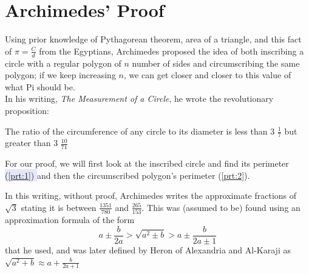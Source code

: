 \documentclass{article}
\begin{document}
\begin{theorem}\label{thm:ipsum}

\end{theorem}



\section{Archimedes' Proof}
Using prior knowledge of Pythagorean theorem, area of a triangle, and this fact of $\pi = \frac{C}{d}$ from the Egyptians, Archimedes proposed the idea of both inscribing a circle with a regular polygon of $n$ number of sides and circumscribing the same polygon; if we keep increasing $n$, we can get closer and closer to this value of what Pi should be. \\

In his writing, \textit{The Measurement of a Circle}, he wrote the revolutionary proposition:
\begin{proposition}
The ratio of the circumference of any circle to its diameter is less than 3 $\frac{1}{7}$ but greater than 3 $\frac{10}{71}$
\end{proposition}

For our proof, we will first look at the inscribed circle and find its perimeter \colorbox{Lavender}{(\ref{prt:1}) %
} and then the circumscribed polygon's perimeter (\ref{prt:2}). \\

\begin{remark} \label{rmk:approx}
In this writing, without proof, Archimedes writes the approximate fractions of $\sqrt{3}$ stating it is between $\frac{1351}{780}$ and $\frac{265}{153}$. This was (assumed to be) found using an approximation formula of the form 
\[a\pm\frac{b}{2a} > \sqrt{a^2 \pm b} > a \pm \frac{b}{2a\pm 1}\] that he used, and was later defined by Heron of Alexandria and Al-Karaji as $\sqrt{a^2 + b} \approx a + \frac{b}{2a+ 1}$
\end{remark}
\end{document}
